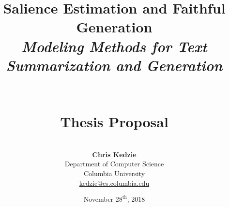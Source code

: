 \documentclass[12pt]{article}
\title{\textbf{Salience Estimation and Faithful Generation}\\
    \textit{\large Modeling Methods for Text Summarization and Generation}\\
       ~\\
       ~\\\large\textbf{Thesis Proposal}}
\author{~\\
        \textbf{Chris Kedzie}\\
        Department of Computer Science\\
        Columbia University\\
        \url{kedzie@cs.columbia.edu}}
\date{November $28^{\textrm{th}}$, 2018}
\begin{document}
\maketitle

\pagebreak

\renewcommand{\thepage}{\roman{page}}
\setcounter{page}{1}

\begin{abstract}
  
\end{abstract}

\pagebreak

\tableofcontents
\newpage



%

\newpage

\renewcommand{\thepage}{\arabic{page}}
\setcounter{page}{1}

\def\highlevel{true}


%









%
\end{document}
